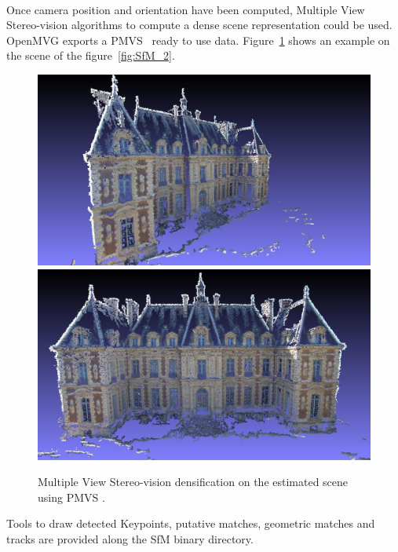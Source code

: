 \documentclass[11pt, letterpaper]{report}
\begin{document}
\paragraph{}
Once camera position and orientation have been computed, Multiple View Stereo-vision algorithms to compute a dense scene representation could be used. OpenMVG exports a PMVS~\cite{Furu:2010,Furu:2010:PMVS} ready to use data. Figure~\ref{fig:SfM_PMVS} shows an example on the scene of the figure~\ref{fig:SfM_2}.
\noindent
\begin{figure}[h!]
\begin{center}
\includegraphics[scale=.2]{figures/sfm/dense_Side.jpg}
\includegraphics[scale=.2]{figures/sfm/dense_Front.jpg}
\caption{Multiple View Stereo-vision densification on the estimated scene using PMVS \cite{Furu:2010,Furu:2010:PMVS}.}
\label{fig:SfM_PMVS}
\end{center}
\end{figure}

Tools to draw detected Keypoints, putative matches, geometric matches and tracks are provided along the SfM binary directory.
\end{document}
